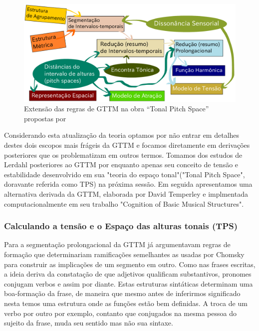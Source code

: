 \documentclass[
	12pt,				%
	openright,			%
	twoside,			%
	a4paper,			%
	english,			%
	french,				%
	spanish,			%
	brazil				%
	]{abntex2}
\begin{document}
\begin{figure}[!h]
	\caption{\label{fig_grafico}Extensão das regras de GTTM na obra “Tonal Pitch Space” propostas por  }
	\begin{center}
	    \includegraphics[scale=0.5]{gttm/GTTM_TPS_rules.pdf}
	\end{center}
\end{figure}


Considerando esta atualização da teoria optamos por não entrar em detalhes destes dois escopos mais frágeis da GTTM e focamos diretamente em derivações posteriores que os problematizam em outros termos. Tomamos dos estudos de Lerdahl posteriores ao GTTM  por enquanto apenas seu conceito de tensão e estabilidade desenvolvido em sua "teoria do espaço tonal"("Tonal Pitch Space", doravante referida como TPS) na próxima sessão. Em seguida apresentamos uma alternativa derivada da GTTM, elaborada por David Temperley e implmentada computacionalmente em seu trabalho "Cognition of Basic Musical Structures"\cite{temperley2004cognition}.



\pagebreak
\subsubsection{Calculando a tensão e o Espaço das alturas tonais (TPS) }


Para a segmentação prolongacional da GTTM  já argumentavam regras de formação que determinariam ramificações semelhantes as usadas por Chomsky\cite{chomsky1957syntactic} para construir as implicações de um segmento em outro. Como nas frases escritas, a ideia deriva da constatação de que adjetivos qualificam substantivos, pronomes conjugam verbos e assim por diante. Estas estruturas sintáticas determinam uma boa-formação da frase, de maneira que mesmo antes de inferirmos significado nesta temos uma estrutura onde as funções estão bem definidas. A troca de um verbo por outro por exemplo, contanto que conjugados na mesma pessoa do sujeito da frase, muda seu sentido mas não sua sintaxe.
\end{document}
